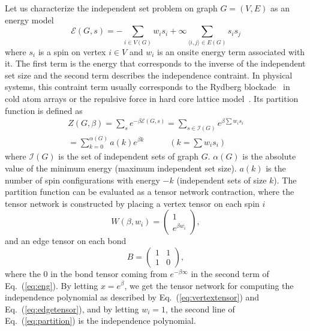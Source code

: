 \documentclass[onefignum, onetabnum]{siamart190516}
\newcommand{\<}{\langle}
\renewcommand{\>}{\rangle}
\newcommand{\Eq}[1]{Eq.~(\ref{#1})}
\begin{document}
Let us characterize the independent set problem on graph $G=(V, E)$ as an energy model
\begin{equation}\label{eq:eng}
    \mathcal{E}(G, s) = -\sum_{i\in V(G)} w_i s_i + \infty \sum_{\langle i,j\rangle \in E(G)}s_i s_j
\end{equation}
where $s_i$ is a spin on vertex $i \in V$ and $w_i$ is an onsite energy term associated with it.
The first term is the energy that corresponds to the inverse of the independent set size and the second term describes the independence contraint.
In physical systems, this contraint term usually corresponds to the Rydberg blockade~\cite{Pichler2018, Ebadi2022} in cold atom arrays or the repulsive force in hard core lattice model~\cite{Dyre2016, Fernandes2007}.
Its partition function is defined as
\begin{equation}\label{eq:partition}
    \begin{split}
    Z(G, \beta) = \sum_{s}e^{-\beta \mathcal{E}(G, s)} = \sum_{s\in \mathcal{I}(G)} e^{\beta \sum w_i s_i}\\
         = \sum_{k=0}^{\alpha(G)}a(k) e^{\beta k}  \qquad \quad (k = \sum w_i s_i)
    \end{split}
\end{equation}
where $\mathcal{I}(G)$ is the set of independent sets of graph $G$.
$\alpha(G)$ is the absolute value of the minimum energy (maximum independent set size).
$a(k)$ is the number of spin configurations with energy $-k$ (independent sets of size $k$).
The partition function can be evaluated as a tensor network contraction,
where the tensor network is constructed by placing a vertex tensor on each spin $i$
\begin{equation}
    W(\beta, w_i) = \left(\begin{matrix}
        1 \\
        e^{\beta w_i}
    \end{matrix}\right),
\end{equation}
and an edge tensor on each bond
\begin{equation}
       B = \left(\begin{matrix}
        1  & 1\\
        1 & 0
    \end{matrix}\right),
\end{equation}
where the $0$ in the bond tensor coming from $e^{-\beta\infty}$ in the second term of \Eq{eq:eng}.
By letting $x = e^{\beta}$, we get the tensor network for computing the independence polynomial as described by \Eq{eq:vertextensor} and \Eq{eq:edgetensor},
and by letting $w_i=1$, the second line of \Eq{eq:partition} is the independence polynomial.
\end{document}
